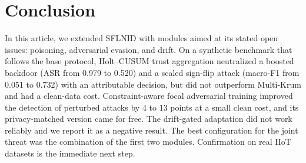 \documentclass[journal]{IEEEtran}
\begin{document}
\section{Conclusion}
In this article, we extended SFLNID with modules aimed at its stated open issues: poisoning, adversarial evasion, and drift. On a synthetic benchmark that follows the base protocol, Holt--CUSUM trust aggregation neutralized a boosted backdoor (ASR from 0.979 to 0.520) and a scaled sign-flip attack (macro-F1 from 0.051 to 0.732) with an attributable decision, but did not outperform Multi-Krum and had a clean-data cost. Constraint-aware focal adversarial training improved the detection of perturbed attacks by 4 to 13 points at a small clean cost, and its privacy-matched version came for free. The drift-gated adaptation did not work reliably and we report it as a negative result. The best configuration for the joint threat was the combination of the first two modules. Confirmation on real IIoT datasets is the immediate next step.
\end{document}
